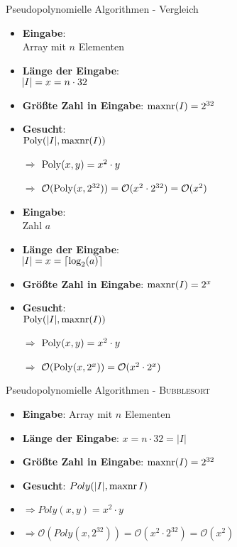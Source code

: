 \begin{frame}{Pseudopolynomielle Algorithmen - Vergleich}
    \begin{minipage}[t]{0.5\textwidth}
    	\begin{itemize}
            \item \textbf{Eingabe}: \\ Array mit $n$ Elementen
            \item \textbf{Länge der Eingabe}: \\ $\abs{I} = x = n\cdot 32$
            \item \textbf{Größte Zahl in Eingabe}: $\operatorname{maxnr}(I)=2^{32}$
            \item \textbf{Gesucht}: \\ $\operatorname{Poly}(\vert I \vert, \operatorname{maxnr}(I))$
            \item[$\Rightarrow$] $\operatorname{Poly}(x,y)=x^2\cdot y$
            \item[$\Rightarrow$] $\mathcal{O}(\operatorname{Poly}(x,2^{32})) = \mathcal{O}(x^2 \cdot 2^{32}) = \mathcal{O}(x^2)$
        \end{itemize}
    \end{minipage}
    \pause
    \hspace{2mm}
    \begin{minipage}[t]{0.47\textwidth}
        \begin{itemize}
            \item \textbf{Eingabe}: \\ Zahl $a$
            \item \textbf{Länge der Eingabe}: \\ $\abs{I} = x = \lceil \log_2(a)\rceil$
            \item \textbf{Größte Zahl in Eingabe}: $\operatorname{maxnr}(I)=2^x$
            \item \textbf{Gesucht}: \\ $\operatorname{Poly}(\vert I \vert, \operatorname{maxnr}(I))$
            \item[$\Rightarrow$] $\operatorname{Poly}(x,y)=x^2\cdot y$
            \item[$\Rightarrow$] $\mathcal{O}(\operatorname{Poly}(x,2^x)) = \mathcal{O}(x^2 \cdot 2^x)$
        \end{itemize}
    \end{minipage}
 \end{frame}

\begin{frame}{Pseudopolynomielle Algorithmen - \textsc{Bubblesort}}
	\begin{itemize}
		\item \textbf{Eingabe}: Array mit $n$ Elementen
		\item \textbf{Länge der Eingabe}: $x = n\cdot 32 = \vert I \vert$
		\item \textbf{Größte Zahl in Eingabe}: $\operatorname{maxnr}(I)=2^{32}$
		\item \textbf{Gesucht}: $Poly(\vert I \vert, \operatorname{maxnr}{I})$
		\item $\Rightarrow Poly(x,y)=x^2\cdot y$
		\item $\Rightarrow \mathcal{O}(Poly(x,2^{32})) = \mathcal{O}(x^2 \cdot 2^{32}) = \mathcal{O}(x^2)$
	\end{itemize}
\end{frame}

